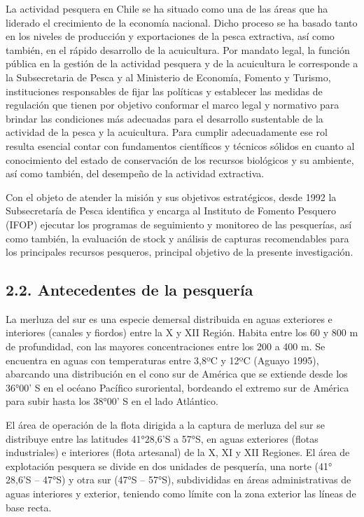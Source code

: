 \documentclass[
  spanish,
]{article}
\begin{document}
La actividad pesquera en Chile se ha situado como una de las áreas que
ha liderado el crecimiento de la economía nacional. Dicho proceso se ha
basado tanto en los niveles de producción y exportaciones de la pesca
extractiva, así como también, en el rápido desarrollo de la acuicultura.
Por mandato legal, la función pública en la gestión de la actividad
pesquera y de la acuicultura le corresponde a la Subsecretaria de Pesca
y al Ministerio de Economía, Fomento y Turismo, instituciones
responsables de fijar las políticas y establecer las medidas de
regulación que tienen por objetivo conformar el marco legal y normativo
para brindar las condiciones más adecuadas para el desarrollo
sustentable de la actividad de la pesca y la acuicultura. Para cumplir
adecuadamente ese rol resulta esencial contar con fundamentos
científicos y técnicos sólidos en cuanto al conocimiento del estado de
conservación de los recursos biológicos y su ambiente, así como también,
del desempeño de la actividad extractiva.

Con el objeto de atender la misión y sus objetivos estratégicos, desde
1992 la Subsecretaría de Pesca identifica y encarga al Instituto de
Fomento Pesquero (IFOP) ejecutar los programas de seguimiento y
monitoreo de las pesquerías, así como también, la evaluación de stock y
análisis de capturas recomendables para los principales recursos
pesqueros, principal objetivo de la presente investigación.

\hypertarget{antecedentes-de-la-pesqueruxeda}{%
\subsection{2.2. Antecedentes de la
pesquería}\label{antecedentes-de-la-pesqueruxeda}}

La merluza del sur es una especie demersal distribuida en aguas
exteriores e interiores (canales y fiordos) entre la X y XII Región.
Habita entre los 60 y 800 m de profundidad, con las mayores
concentraciones entre los 200 a 400 m. Se encuentra en aguas con
temperaturas entre 3,8ºC y 12ºC (Aguayo 1995), abarcando una
distribución en el cono sur de América que se extiende desde los 36°00'
S en el océano Pacífico suroriental, bordeando el extremo sur de América
para subir hasta los 38°00' S en el lado Atlántico.

El área de operación de la flota dirigida a la captura de merluza del
sur se distribuye entre las latitudes 41°28,6'S a 57°S, en aguas
exteriores (flotas industriales) e interiores (flota artesanal) de la X,
XI y XII Regiones. El área de explotación pesquera se divide en dos
unidades de pesquería, una norte (41° 28,6'S -- 47°S) y otra sur (47°S
-- 57°S), subdivididas en áreas administrativas de aguas interiores y
exterior, teniendo como límite con la zona exterior las líneas de base
recta.
\end{document}

